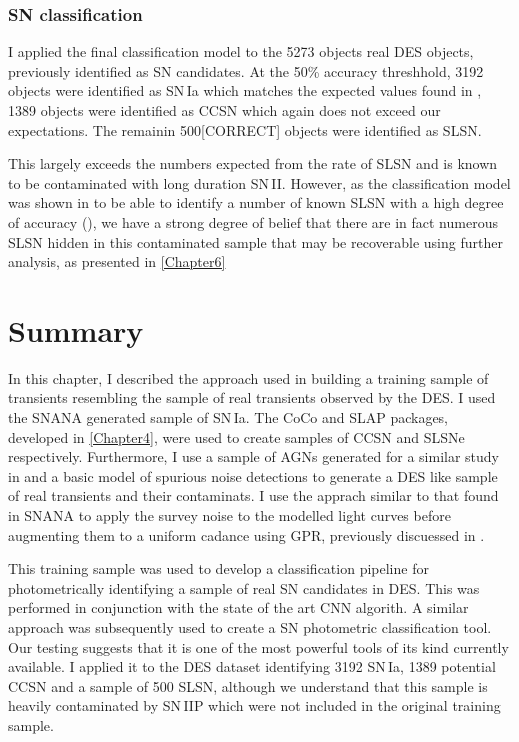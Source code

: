 \begin{table}
  \caption{}
  \label{tab:SLSNTruth}

\end{table}

\subsubsection{SN classification}
I applied the final classification model to the 5273 objects real DES objects, previously identified as SN candidates. At the 50\% accuracy threshhold, 3192 objects were identified as SN\,Ia which matches the expected values found in \citep{Bernstein2012}, 1389 objects were identified as CCSN which again does not exceed our expectations. The remainin 500[CORRECT] objects were identified as SLSN.

This largely exceeds the numbers expected from the rate of SLSN and is known to be contaminated with long duration SN\,II. However, as the classification model was shown in  to be able to identify a number of known SLSN with a high degree of accuracy (), we have a strong degree of belief that there are in fact numerous SLSN hidden in this contaminated sample that may be recoverable using further analysis, as presented in \cref{Chapter6}

\section{Summary}
In this chapter, I described the approach used in building a training sample of transients resembling the sample of real transients observed by the DES. I used the SNANA generated sample of SN\,Ia. The CoCo and SLAP packages, developed in \cref{Chapter4}, were used to create samples of CCSN and SLSNe respectively. Furthermore, I use a sample of AGNs generated for a similar study in \citet{Hoenig2014} and a basic model of spurious noise detections to generate a DES like sample of real transients and their contaminats. I use the apprach similar to that found in SNANA to apply the survey noise to the modelled light curves before augmenting them to a uniform cadance using GPR, previously discuessed in .

This training sample was used to develop a classification pipeline for photometrically identifying a sample of real SN candidates in DES. This was performed in conjunction with the state of the art CNN algorith. A similar approach was subsequently used to create a SN photometric classification tool. Our testing suggests that it is one of the most powerful tools of its kind currently available. I applied it to the DES dataset identifying 3192 SN\,Ia, 1389 potential CCSN and a sample of 500 SLSN, although we understand that this sample is heavily contaminated by SN\,IIP which were not included in the original training sample.

